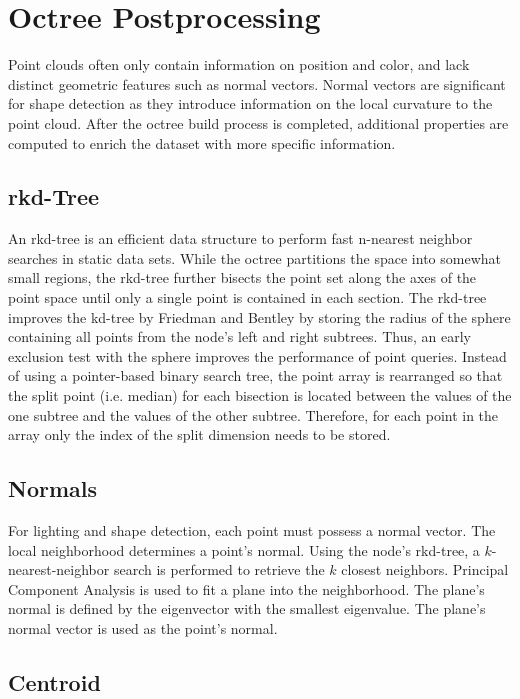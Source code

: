 \section{Octree Postprocessing}

Point clouds often only contain information on position and color, and lack distinct geometric features such as normal vectors. Normal vectors are significant for shape detection as they introduce information on the local curvature to the point cloud. After the octree build process is completed, additional properties are computed to enrich the dataset with more specific information. 


\subsection{rkd-Tree}

An rkd-tree \cite{tobler2011rkd} is an efficient data structure to perform fast n-nearest neighbor searches in static data sets. While the octree partitions the space into somewhat small regions, the rkd-tree further bisects the point set along the axes of the point space until only a single point is contained in each section. The rkd-tree improves the kd-tree by Friedman and Bentley \cite{friedman1975algorithm} by storing the radius of the sphere containing all points from the node's left and right subtrees. Thus, an early exclusion test with the sphere improves the performance of point queries. Instead of using a pointer-based binary search tree, the point array is rearranged so that the split point (i.e. median) for each bisection is located between the values of the one subtree and the values of the other subtree. Therefore, for each point in the array only the index of the split dimension needs to be stored. 


\subsection{Normals}

For lighting and shape detection, each point must possess a normal vector. The local neighborhood determines a point's normal. Using the node's rkd-tree, a $k$-nearest-neighbor search is performed to retrieve the $k$ closest neighbors. Principal Component Analysis \cite{jolliffe2002principal} is used to fit a plane into the neighborhood. The plane's normal is defined by the eigenvector with the smallest eigenvalue. The plane's normal vector is used as the point's normal.


\subsection{Centroid}

